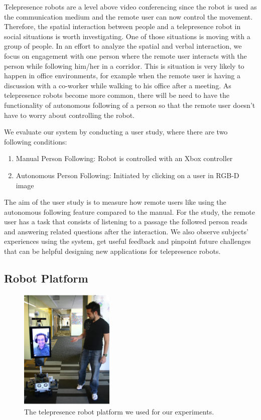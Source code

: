 Telepresence robots are a level above video conferencing since the robot is used as the communication medium and the remote user can now control the movement. Therefore, the spatial interaction between people and a telepresence robot in social situations is worth investigating. One of those situations is moving with a group of people. In an effort to analyze the spatial and verbal interaction, we focus on engagement with one person where the remote user interacts with the person while following him/her in a corridor. This is situation is very likely to happen in office environments, for example when the remote user is having a discussion with a co-worker while walking to his office after a meeting. As telepresence robots become more common, there will be need to have the functionality of autonomous following of a person so that the remote user doesn't have to worry about controlling the robot.

We evaluate our system by conducting a user study, where there are two following conditions:

\begin{enumerate}
\item Manual Person Following: Robot is controlled with an Xbox controller
\item Autonomous Person Following: Initiated by clicking on a user in RGB-D image
\end{enumerate}

The aim of the user study is to measure how remote users like using the autonomous following feature compared to the manual. For the study, the remote user has a task that consists of listening to a passage the followed person reads and answering related questions after the interaction. We also observe subjects' experiences using the system, get useful feedback and pinpoint future challenges that can be helpful designing new applications for telepresence robots.

\subsection{Robot Platform}

\begin{figure}[h!]
\centering
\includegraphics[width=0.4\textwidth]{pics/telepresence_robot}
\caption{The telepresence robot platform we used for our experiments.}
\label{fig:telepresence_robot}
\end{figure}

